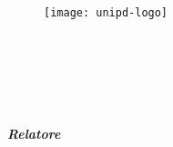 \begin{titlepage}
    \begin{center}
        \begin{LARGE}
            \textbf{\myUni}\\
        \end{LARGE}

        \vspace{10pt}

        \begin{Large}
            \textsc{\myDepartment}\\
        \end{Large}

        \vspace{10pt}

        \begin{large}
            \textsc{\myFaculty}\\
        \end{large}

        \vspace{30pt}
        \begin{figure}[htbp]
            \centering
            \texttt{[image: unipd-logo]}
        \end{figure}
        \vspace{30pt}

        \begin{large}
            \textsl{\myDegree}\\
        \end{large}

        \begin{LARGE}
            \textbf{\myTitle}\\
        \end{LARGE}
        \vspace{0.2cm}
        \begin{large}
            \textsl{\myTime}\\
        \end{large}


        \vspace{10pt}

        

        \vspace{40pt}

        \begin{large}
            \begin{flushleft}
                \textit{\textbf{Relatore}}\\
                \vspace{5pt}
                \profTitle\ \myProf
            \end{flushleft}


\end{large}
\end{center}
\end{titlepage}

